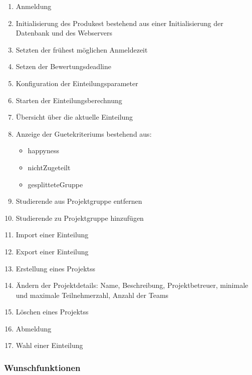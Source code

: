 \documentclass[parskip=full]{scrartcl}
\newcommand{\swtLabel}[1]{\textbf{/#1\arabic*0/}}
\begin{document}
\begin{enumerate}[label=\swtLabel{FA}, resume]
  \item Anmeldung \label{FAadminanmeldung}
  \item Initialisierung des Produkest bestehend aus einer Initialisierung der
  Datenbank und des Webservers
  \label{FAinit}
  \item Setzten der frühest möglichen Anmeldezeit \label{FAadminanmeldezeit}
  \item Setzen der Bewertungsdeadline \label{FAadmindeadline}
  \item Konfiguration der Einteilungsparameter \label{FAadminparameter}%
  \item Starten der Einteilungsberechnung \label{FAadminEinteilungstart}
  \item Übersicht über die aktuelle Einteilung \label{FAadminÜbersicht}
  \item Anzeige der \glspl{Guetekriterium} bestehend aus:
    \begin{itemize}
      \item \gls{happyness}
      \item \gls{nichtZugeteilt}
      \item \gls{gesplitteteGruppe}
    \end{itemize} \label{FAadminGüte}
  \item Studierende aus Projektgruppe entfernen \label{FAadmin+Stud}
  \item Studierende zu Projektgruppe hinzufügen \label{FAadmin-Stud}
  \item Import einer Einteilung \label{FAimport}
  \item Export einer Einteilung \label{FAexport}
  \item Erstellung eines \glspl{Projekt}s \label{FAadmin+projekt}
  \item Ändern der Projektdetails: Name, Beschreibung, Projektbetreuer, %
        minimale und maximale Teilnehmerzahl, Anzahl der Teams
        \label{FAadminProjektänderung}
  \item Löschen eines \glspl{Projekt}s \label{FAadmin-Projekt}
  \item Abmeldung \label{FAadminAbmeldung}
  \item Wahl einer Einteilung \label{FAadminAuswahl}
\end{enumerate}

\subsubsection{Wunschfunktionen}
\end{document}
